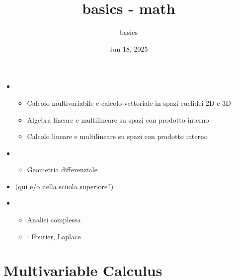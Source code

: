\documentclass[letterpaper,10pt,english]{jupyterBook}
\title{basics - math}
\date{Jan 18, 2025}
\author{basics}
\begin{document}
\pagestyle{empty}
\sphinxmaketitle
\pagestyle{plain}
\sphinxtableofcontents
\pagestyle{normal}
\label{\detokenize{intro::doc}}


\sphinxAtStartPar
{}
\begin{itemize}
\item {} 
\sphinxAtStartPar
{}
\begin{itemize}
\item {} 
\sphinxAtStartPar
Calcolo multivariabile e calcolo vettoriale in spazi euclidei 2D e 3D

\item {} 
\sphinxAtStartPar
Algebra lineare e multilineare su spazi con prodotto interno

\item {} 
\sphinxAtStartPar
Calcolo lineare e multilineare su spazi con prodotto interno

\end{itemize}

\item {} 
\sphinxAtStartPar
{}
\begin{itemize}
\item {} 
\sphinxAtStartPar
Geometria differenziale

\end{itemize}

\item {} 
\sphinxAtStartPar
{} (qui e/o nella scuola superiore?)

\item {} 
\sphinxAtStartPar
{}
\begin{itemize}
\item {} 
\sphinxAtStartPar
Analisi complessa

\item {} 
\sphinxAtStartPar
{}: Fourier, Laplace

\end{itemize}

\end{itemize}

\sphinxstepscope


\part{Multivariable Calculus}

\sphinxstepscope
\end{document}
